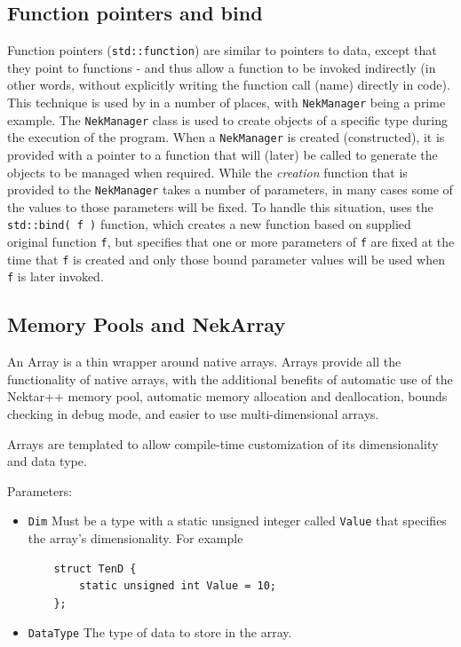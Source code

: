 \subsection{Function pointers and bind}
Function pointers
  (\lstinline{std::function}) are similar to pointers to data, except that
  they point to functions - and thus allow a function to be invoked
  indirectly (in other words, without explicitly writing the function
  call (name) directly in code).  This technique is used by {\nek}
  in a number of places, with \lstinline{NekManager} being a prime example.
  The \lstinline{NekManager} class is used to create objects of a specific
  type during the execution of the program.  When a \lstinline{NekManager} is
  created (constructed), it is provided with a pointer to a function
  that will (later) be called to generate the objects to be managed when required.  While
  the \emph{creation} function that is provided to the \lstinline{NekManager}
  takes a number of parameters, in many cases some of the values to
  those parameters will be fixed.  To handle this situation, {\nek}
  uses the \lstinline{std::bind( f )} function, which creates a new function
  based on supplied original function \lstinline{f}, but specifies that one
  or more parameters of \lstinline{f} are fixed at the time that \lstinline{f} is created and only those bound parameter values will be used when
  \lstinline{f} is later invoked.  


\subsection{Memory Pools and NekArray}
An Array is a thin wrapper around native arrays. Arrays provide all the
functionality of native arrays, with the additional benefits of automatic use of
the Nektar++ memory pool, automatic memory allocation and deallocation, bounds
checking in debug mode, and easier to use multi-dimensional arrays.

Arrays are templated to allow compile-time customization of its dimensionality
and data type.

Parameters:
\begin{itemize}
    \item \lstinline{Dim} Must be a type with a static unsigned integer called
    \lstinline{Value} that specifies the array's dimensionality. For example
    \begin{lstlisting}
    struct TenD {
        static unsigned int Value = 10;
    };
    \end{lstlisting}
    \item \lstinline{DataType} The type of data to store in the array.
\end{itemize}

